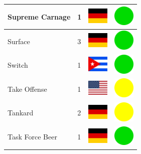 \documentclass[12pt, a4paper, twoside]{report}
\begin{document}
\begin{center}
\begin{longtable}{|p{5cm}|p{2cm}|p{2cm}|p{2cm}|}
			Supreme Carnage & 1 & \includegraphics[width=1cm]{4x3/de} & \includegraphics[width=1cm]{likes/y} \\ \hline
			Surface & 3 & \includegraphics[width=1cm]{4x3/de} & \includegraphics[width=1cm]{likes/y} \\ \hline
			Switch & 1 & \includegraphics[width=1cm]{4x3/cu} & \includegraphics[width=1cm]{likes/y} \\ \hline
			Take Offense & 1 & \includegraphics[width=1cm]{4x3/us} & \includegraphics[width=1cm]{likes/m} \\ \hline
			Tankard & 2 & \includegraphics[width=1cm]{4x3/de} & \includegraphics[width=1cm]{likes/m} \\ \hline
			Task Force Beer & 1 & \includegraphics[width=1cm]{4x3/de} & \includegraphics[width=1cm]{likes/y} \\ \hline

\end{longtable}
\end{center}
\end{document}
